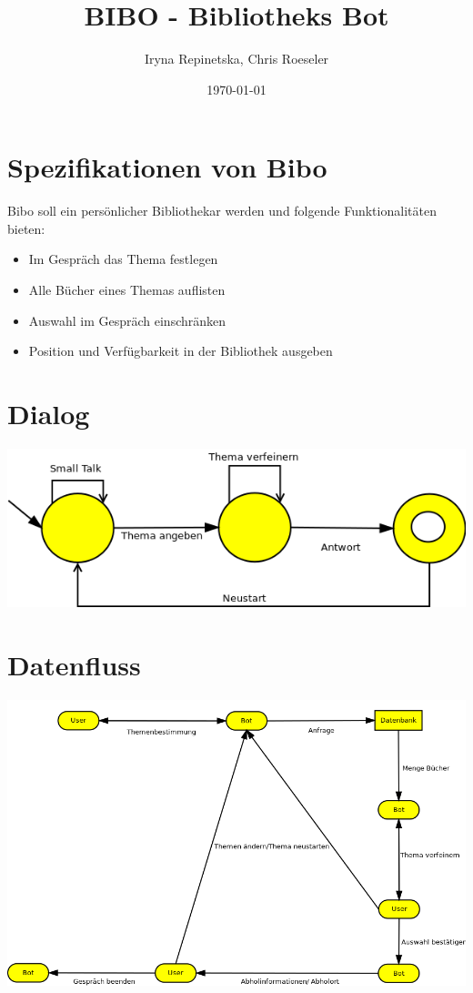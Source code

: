 \documentclass[9pt]{beamer}
\author{Iryna Repinetska, Chris Roeseler}
\title{BIBO - Bibliotheks Bot}
\institute{Institut f\"ur Informatik Humboldt-Universit\"at zu Berlin}
\date{\today}
\begin{document}
\begin{frame}%
  \titlepage %
\end{frame} %

\section{Spezifikationen von Bibo}
\begin{frame}
  Bibo soll ein persönlicher Bibliothekar werden und folgende Funktionalitäten bieten:
\begin{itemize}
\item Im Gespräch das Thema festlegen
\item Alle Bücher eines Themas auflisten
\item Auswahl im Gespräch einschränken
\item Position und Verfügbarkeit in der Bibliothek ausgeben
\end{itemize}
\end{frame}

\section{Dialog}
\begin{frame}
\includegraphics[width=\textwidth]{Diagram1.png} %
\end{frame}

\section{Datenfluss}
\begin{frame}
\includegraphics[width=\textwidth]{Diagram2.png} %
\end{frame}
\end{document}
